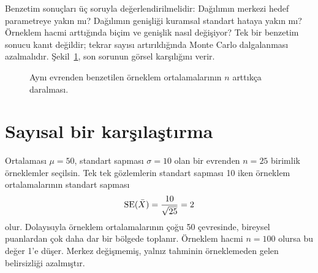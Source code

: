 Benzetim sonuçları üç soruyla değerlendirilmelidir: Dağılımın merkezi hedef
parametreye yakın mı? Dağılımın genişliği kuramsal standart hataya yakın mı?
Örneklem hacmi arttığında biçim ve genişlik nasıl değişiyor? Tek bir benzetim
sonucu kanıt değildir; tekrar sayısı artırıldığında Monte Carlo dalgalanması
azalmalıdır. Şekil~\ref{fig:sampling-size-narrowing}, son sorunun görsel
karşılığını verir.

\begin{figure}[H]
\centering
{}
\caption{Aynı evrenden benzetilen örneklem ortalamalarının $n$ arttıkça daralması.}
\label{fig:sampling-size-narrowing}
\end{figure}

\section{Sayısal bir karşılaştırma}

Ortalaması $\mu=50$, standart sapması $\sigma=10$ olan bir evrenden
$n=25$ birimlik örneklemler seçilsin. Tek tek gözlemlerin standart sapması
10 iken örneklem ortalamalarının standart sapması
\[
\operatorname{SE}(\bar X)=\frac{10}{\sqrt{25}}=2
\]
olur. Dolayısıyla örneklem ortalamalarının çoğu 50 çevresinde, bireysel
puanlardan çok daha dar bir bölgede toplanır. Örneklem hacmi $n=100$ olursa
bu değer 1'e düşer. Merkez değişmemiş, yalnız tahminin örneklemeden gelen
belirsizliği azalmıştır.

